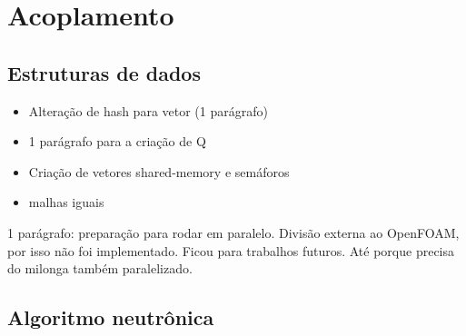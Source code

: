 \section{Acoplamento} %

\subsection{Estruturas de dados}

\begin{itemize}
\item Alteração de hash para vetor (1 parágrafo)
\item 1 parágrafo para a criação de Q
\item Criação de vetores shared-memory e semáforos
  \item malhas iguais
\end{itemize}

1 parágrafo: preparação para rodar em paralelo. Divisão externa ao OpenFOAM, por isso não foi
implementado. Ficou para trabalhos futuros. Até porque precisa do milonga também paralelizado.

\subsection{Algoritmo neutrônica}

